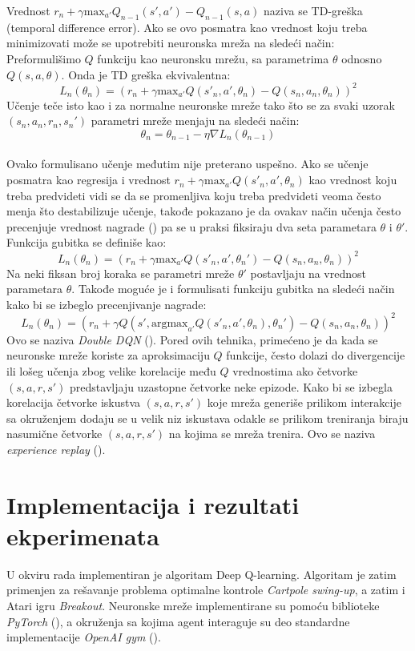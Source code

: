\documentclass[a4paper,fleqn,12pt]{JMThesis}
\theoremstyle{plain}
\theoremstyle{definition}
\theoremstyle{definition}
\begin{document}
Vrednost $r_n + \gamma \text{max}_{a'}Q_{n-1}(s',a') - Q_{n-1}(s,a)$ naziva se TD-greška (temporal difference error). Ako se ovo
posmatra kao vrednost koju treba minimizovati može se upotrebiti neuronska mreža na sledeći način:
Preformulišimo $Q$ funkciju kao neuronsku mrežu, sa parametrima $\theta$ odnosno $Q(s,a,\theta)$. Onda je TD greška ekvivalentna:
\[L_n(\theta_n) = (r_n + \gamma \text{max}_{a'}Q(s'_n,a',\theta_{n}) - Q(s_n,a_n,\theta_{n}))^2 \]
Učenje teče isto kao i za normalne neuronske mreže tako što se za svaki uzorak $(s_n,a_n,r_n,s_n')$ parametri mreže menjaju na sledeći način:
\[ \theta_n = \theta_{n-1} - \eta  \nabla L_n(\theta_{n-1}) \]
\medskip\\
Ovako formulisano učenje međutim nije preterano uspešno. Ako se učenje posmatra kao regresija i vrednost $r_n + \gamma \text{max}_{a'}Q(s'_n,a',\theta_{n})$ 
kao vrednost koju treba predvideti vidi se da se promenljiva koju treba predvideti veoma često menja što destabilizuje učenje, takođe
pokazano je da ovakav način učenja često precenjuje vrednost nagrade (\cite{van2016deep}) pa
se u praksi fiksiraju dva seta parametara $\theta$ i $\theta'$. Funkcija gubitka se definiše kao:
\[L_n(\theta_n) = (r_n + \gamma \text{max}_{a'}Q(s'_n,a',\theta_n') - Q(s_n,a_n,\theta_n))^2 \]
Na neki fiksan broj koraka se parametri mreže $\theta'$ postavljaju na vrednost parametara $\theta$.
Takođe moguće je i formulisati funkciju gubitka na sledeći način kako bi se izbeglo precenjivanje nagrade:
\[L_n(\theta_n) = (r_n + \gamma Q(s',\text{argmax}_{a'}Q(s'_n,a',\theta_n),\theta_n') - Q(s_n,a_n,\theta_n))^2 \]
Ovo se naziva \textit{Double DQN} (\cite{van2016deep}).
Pored ovih tehnika, primećeno je da kada se neuronske mreže koriste za aproksimaciju $Q$ funkcije, često dolazi do divergencije ili
lošeg učenja zbog velike korelacije među $Q$ vrednostima ako četvorke $(s,a,r,s')$ predstavljaju uzastopne četvorke neke epizode.
Kako bi se izbegla korelacija četvorke iskustva $(s,a,r,s')$ koje mreža generiše prilikom interakcije sa okruženjem dodaju se 
u velik niz iskustava odakle se prilikom treniranja biraju nasumične četvorke $(s,a,r,s')$ na kojima se mreža trenira. Ovo se naziva
\textit{experience replay} (\cite{mnih2015human}).
\chapter{Implementacija i rezultati ekperimenata}
U okviru rada implementiran je algoritam Deep Q-learning. Algoritam je zatim primenjen za rešavanje problema optimalne kontrole
\textit{Cartpole swing-up}, a zatim i Atari igru \textit{Breakout}. Neuronske mreže implementirane su
pomoću biblioteke \textit{PyTorch} (\cite{NEURIPS2019_9015}), a okruženja sa kojima agent interaguje su deo standardne
implementacije \textit{OpenAI gym} (\cite{1606.01540}).
\end{document}
